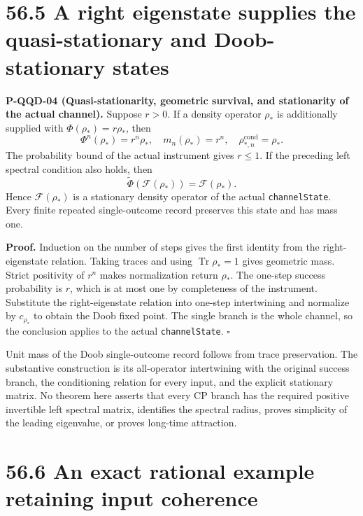 \documentclass[
  11pt,
  oneside]{book}
\begin{document}
\section{56.5 A right eigenstate supplies the quasi-stationary and
Doob-stationary states}

\label{p-qqd-04}{}

\textbf{P-QQD-04 (Quasi-stationarity, geometric survival, and
stationarity of the actual channel).} Suppose \(r>0\). If a density
operator \(\rho_*\) is additionally supplied with
\(\Phi(\rho_*)=r\rho_*\), then \[
\Phi^n(\rho_*)=r^n\rho_*,\quad m_n(\rho_*)=r^n,
\quad \rho_{*,n}^{\mathrm{cond}}=\rho_*.
\] The probability bound of the actual instrument gives \(r\le1\). If
the preceding left spectral condition also holds, then \[
\widetilde\Phi(\mathcal F(\rho_*))=\mathcal F(\rho_*).
\] Hence \(\mathcal F(\rho_*)\) is a stationary density operator of the
actual \texttt{channel\allowbreak State}. Every finite repeated single-outcome
record preserves this state and has mass one.

\textbf{Proof.} Induction on the number of steps gives the first
identity from the right-eigenstate relation. Taking traces and using
\(\operatorname{Tr}\rho_*=1\) gives geometric mass. Strict positivity of
\(r^n\) makes normalization return \(\rho_*\). The one-step success
probability is \(r\), which is at most one by completeness of the
instrument. Substitute the right-eigenstate relation into one-step
intertwining and normalize by \(c_{\rho_*}\) to obtain the Doob fixed
point. The single branch is the whole channel, so the conclusion applies
to the actual \texttt{channel\allowbreak State}. \(\square\)

Unit mass of the Doob single-outcome record follows from trace
preservation. The substantive construction is its all-operator
intertwining with the original success branch, the conditioning relation
for every input, and the explicit stationary matrix. No theorem here
asserts that every CP branch has the required positive invertible left
spectral matrix, identifies the spectral radius, proves simplicity of
the leading eigenvalue, or proves long-time attraction.

\section{56.6 An exact rational example retaining input coherence}
\end{document}
